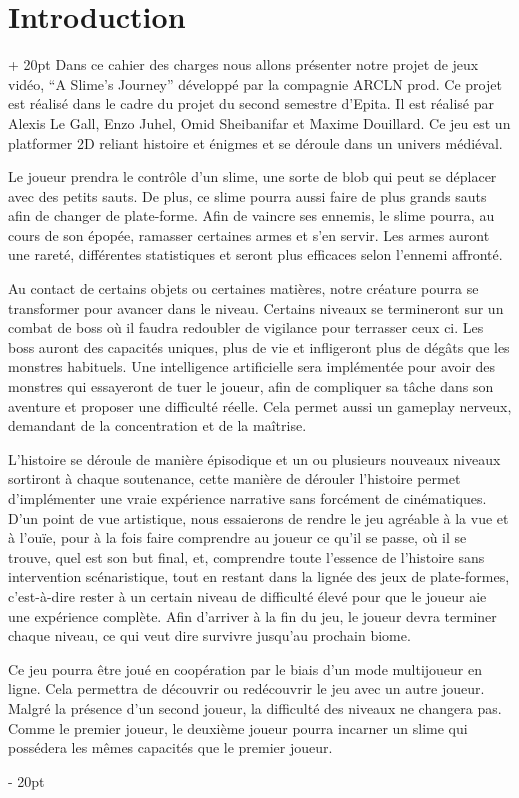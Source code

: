 \documentclass[a4paper, 12pt, twoside]{article}
\newcommand{\ind}[1][20pt]{\advance\leftskip + #1}
\newcommand{\deind}[1][20pt]{\advance\leftskip - #1}
\newenvironment{indt}[2][20pt]{#2 \par \ind[#1]}{\par \deind} %
\begin{document}
    

    \tableofcontents
    \newpage

    \begin{indt}{\section{Introduction}}
        Dans ce cahier des charges nous allons présenter notre projet de jeux vidéo, “A Slime's Journey” développé par la compagnie ARCLN prod. Ce projet est réalisé dans le cadre du projet du second semestre d'Epita. Il est réalisé par Alexis Le Gall, Enzo Juhel, Omid Sheibanifar et Maxime Douillard. Ce jeu est un platformer 2D reliant histoire et énigmes et se déroule dans un univers médiéval.

       Le joueur prendra le contrôle d'un slime, une sorte de blob qui peut se déplacer avec des petits sauts. De plus, ce slime pourra aussi faire de plus grands sauts afin de changer de plate-forme. Afin de vaincre ses ennemis, le slime pourra, au cours de son épopée, ramasser certaines armes et s'en servir. Les armes auront une rareté, différentes statistiques et seront plus efficaces selon l'ennemi affronté.

       Au contact de certains objets ou certaines matières, notre créature pourra se transformer pour avancer dans le niveau. Certains niveaux se termineront sur un combat de boss où il faudra redoubler de vigilance pour terrasser ceux ci. Les boss auront des capacités uniques, plus de vie et infligeront plus de dégâts que les monstres habituels. Une intelligence artificielle sera implémentée pour avoir des monstres qui essayeront de tuer le joueur, afin de  compliquer sa tâche dans son aventure et proposer une difficulté réelle. Cela permet aussi un gameplay nerveux, demandant de la concentration et de la maîtrise.

       L'histoire se déroule de manière épisodique et un ou plusieurs nouveaux niveaux sortiront à chaque soutenance, cette manière de dérouler l'histoire permet d'implémenter une vraie expérience narrative sans forcément de cinématiques. D'un point de vue artistique, nous essaierons de rendre le jeu agréable à la vue et à l'ouïe, pour à la fois faire comprendre au joueur ce qu'il se passe, où il se trouve, quel est son but final, et, comprendre toute l'essence de l'histoire sans intervention scénaristique, tout en restant dans la lignée des jeux de plate-formes, c'est-à-dire rester à un certain niveau de difficulté élevé pour que le joueur aie une expérience complète. Afin d'arriver à la fin du jeu, le joueur devra terminer chaque niveau, ce qui veut dire survivre jusqu'au prochain biome.

       Ce jeu pourra être joué en coopération par le biais d'un mode multijoueur en ligne. Cela permettra de découvrir ou redécouvrir le jeu avec un autre joueur. Malgré la présence d'un second joueur, la difficulté des niveaux ne changera pas. Comme le premier joueur, le deuxième joueur pourra incarner un slime qui possédera les mêmes capacités que le premier joueur.

    \end{indt}
\end{document}

